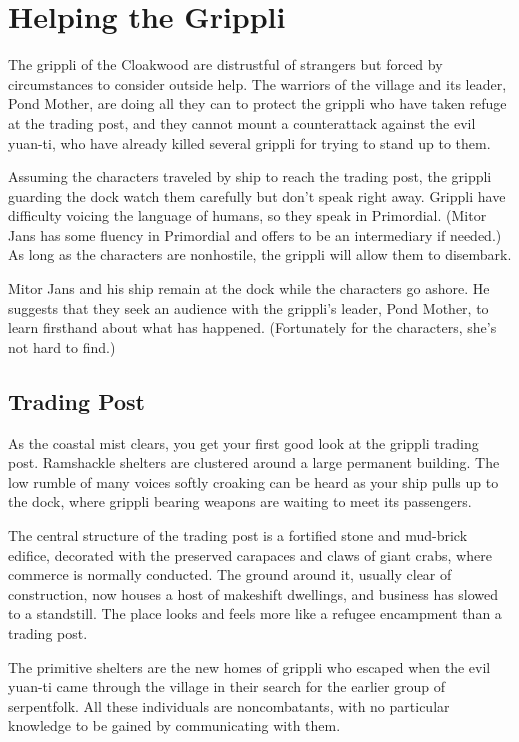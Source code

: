 \documentclass[10pt,a4paper,twoside,bg=print,twocolumn,openany,nodeprecatedcode]{dndbook}
\begin{document}
\section{Helping the Grippli}
The grippli of the Cloakwood are distrustful of strangers but forced by circumstances to consider outside help. The warriors of the village and its leader, Pond Mother, are doing all they can to protect the grippli who have taken refuge at the trading post, and they cannot mount a counterattack against the evil yuan-ti, who have already killed several grippli for trying to stand up to them.

Assuming the characters traveled by ship to reach the trading post, the grippli guarding the dock watch them carefully but don't speak right away. Grippli have difficulty voicing the language of humans, so they speak in Primordial. (Mitor Jans has some fluency in Primordial and offers to be an intermediary if needed.) As long as the characters are nonhostile, the grippli will allow them to disembark.

Mitor Jans and his ship remain at the dock while the characters go ashore. He suggests that they seek an audience with the grippli's leader, Pond Mother, to learn firsthand about what has happened. (Fortunately for the characters, she's not hard to find.)

\subsection{Trading Post}
\begin{DndReadAloud}{}
As the coastal mist clears, you get your first good look at the grippli trading post. Ramshackle shelters are clustered around a large permanent building. The low rumble of many voices softly croaking can be heard as your ship pulls up to the dock, where grippli bearing weapons are waiting to meet its passengers.

\end{DndReadAloud}

The central structure of the trading post is a fortified stone and mud-brick edifice, decorated with the preserved carapaces and claws of giant crabs, where commerce is normally conducted. The ground around it, usually clear of construction, now houses a host of makeshift dwellings, and business has slowed to a standstill. The place looks and feels more like a refugee encampment than a trading post.

The primitive shelters are the new homes of grippli who escaped when the evil yuan-ti came through the village in their search for the earlier group of serpentfolk. All these individuals are noncombatants, with no particular knowledge to be gained by communicating with them.
\end{document}

